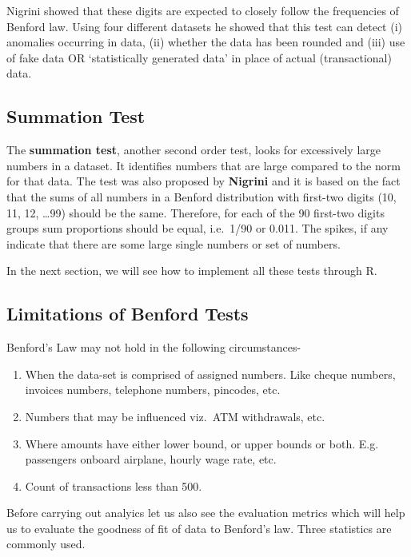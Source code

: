 \documentclass[
]{book}
\providecommand{\tightlist}{%
  \setlength{\itemsep}{0pt}\setlength{\parskip}{0pt}}
\begin{document}
Nigrini showed that these digits are expected to closely follow the frequencies of Benford law. Using four different datasets he showed that this test can detect (i) anomalies occurring in data, (ii) whether the data has been rounded and (iii) use of fake data OR `statistically generated data' in place of actual (transactional) data.

\hypertarget{summation-test}{%
\subsection{Summation Test}\label{summation-test}}

The \textbf{summation test}, another second order test, looks for excessively large numbers in a dataset. It identifies numbers that are large compared to the norm for that data. The test was also proposed by \textbf{Nigrini} \citep{nigrinifraud} and it is based on the fact that the sums of all numbers in a Benford distribution with first-two digits (10, 11, 12, \ldots99) should be the same. Therefore, for each of the 90 first-two digits groups sum proportions should be equal, i.e.~1/90 or 0.011. The spikes, if any indicate that there are some large single numbers or set of numbers.

In the next section, we will see how to implement all these tests through R.

\hypertarget{limitations-of-benford-tests}{%
\subsection{Limitations of Benford Tests}\label{limitations-of-benford-tests}}

Benford's Law may not hold in the following circumstances-

\begin{enumerate}
\def\labelenumi{\arabic{enumi}.}
\tightlist
\item
  When the data-set is comprised of assigned numbers. Like cheque numbers, invoices numbers, telephone numbers, pincodes, etc.
\item
  Numbers that may be influenced viz.~ATM withdrawals, etc.
\item
  Where amounts have either lower bound, or upper bounds or both. E.g. passengers onboard airplane, hourly wage rate, etc.
\item
  Count of transactions less than 500.
\end{enumerate}

Before carrying out analyics let us also see the evaluation metrics which will help us to evaluate the goodness of fit of data to Benford's law. Three statistics are commonly used.
\end{document}
